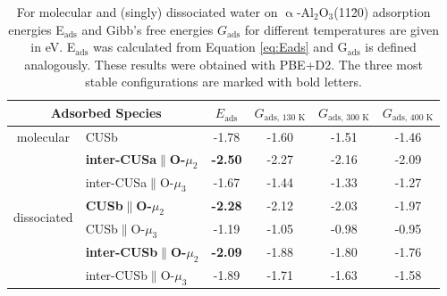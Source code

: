 \documentclass[11pt,DIV=13,BCOR=5mm,a4paper,headinclude]{scrbook}
\begin{document}
\begin{table}[!ht]
  \centering
 \caption{For molecular and (singly) dissociated water on $\upalpha$-Al$_2$O$_3$(11\=20) adsorption energies E$_\textrm{ads}$ and Gibb's free energies $G_\textrm{ads}$ for different temperatures are given in eV.
E$_\textrm{ads}$ was calculated from Equation \ref{eq:Eads} and G$_\textrm{ads}$ is defined analogously.
These results were obtained with PBE+D2.
The three most stable configurations are marked with bold letters.
\vspace*{.2cm} 
  }
  \begin{tabular}{cl|cccc}
  \toprule
   \multicolumn{2}{c|}{Adsorbed Species}  & $E_\text{ads}$ & $G_\text{ads, 130 K}$  &  $G_\text{ads, 300 K}$  & $G_\text{ads, 400 K}$ \\\midrule
\multirow{1}{*}{molecular} & CUSb          &   -1.78  &-1.60 & -1.51  & -1.46 \\\hline
 \multirow{6}{*}{dissociated} & \textbf{inter-CUSa$\parallel$O-$\mu_2$} & \textbf{-2.50} &-2.27 & -2.16 & -2.09 \\
  & inter-CUSa$\parallel$O-$\mu_3$ & -1.67 &-1.44 &-1.33 & -1.27 \\
  & \textbf{CUSb$\parallel$O-$\mu_2$} & \textbf{-2.28} & -2.12& -2.03 &-1.97  \\
 & CUSb$\parallel$O-$\mu_3$ & -1.19 &-1.05 &-0.98 & -0.95 \\%
 & \textbf{inter-CUSb$\parallel$O-$\mu_2$} & \textbf{-2.09} &-1.88 &-1.80 & -1.76 \\
 & inter-CUSb$\parallel$O-$\mu_3$ & -1.89 &-1.71 & -1.63 & -1.58 \\\bottomrule
  \end{tabular}
  \label{tab:ads_1water}
\end{table}
\end{document}
